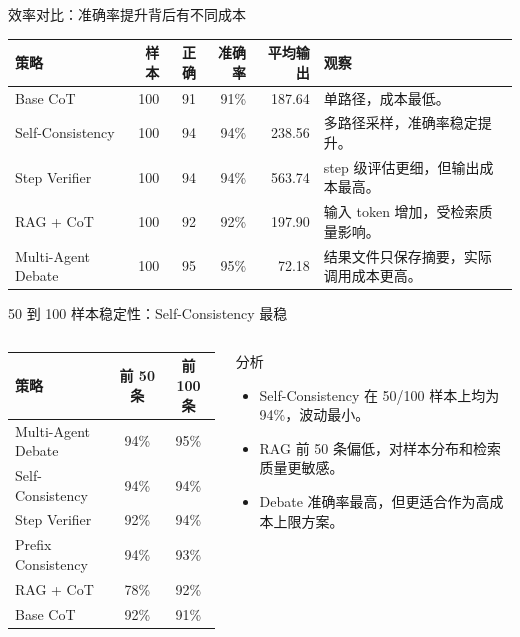 \documentclass[10pt,aspectratio=169]{beamer}
\newcommand{\tightitems}{\setlength{\itemsep}{0.24em}}
\newcommand{\smallnote}[1]{\vspace{0.25em}{\scriptsize\textcolor{Muted}{#1}}}
\begin{document}
\begin{frame}{效率对比：准确率提升背后有不同成本}
  \small
  \begin{tabularx}{\linewidth}{lrrrrY}
    \toprule
    策略 & 样本 & 正确 & 准确率 & 平均输出 & 观察 \\
    \midrule
    Base CoT & 100 & 91 & 91\% & 187.64 & 单路径，成本最低。 \\
    Self-Consistency & 100 & 94 & 94\% & 238.56 & 多路径采样，准确率稳定提升。 \\
    Step Verifier & 100 & 94 & 94\% & 563.74 & step 级评估更细，但输出成本最高。 \\
    RAG + CoT & 100 & 92 & 92\% & 197.90 & 输入 token 增加，受检索质量影响。 \\
    Multi-Agent Debate & 100 & 95 & 95\% & 72.18 & 结果文件只保存摘要，实际调用成本更高。 \\
    \bottomrule
  \end{tabularx}
  \smallnote{单位为实验 JSON 记录的平均 output tokens；Debate 的记录低估了真实中间讨论成本。}
\end{frame}

\begin{frame}{50 到 100 样本稳定性：Self-Consistency 最稳}
  \begin{columns}[T,onlytextwidth]
    \begin{column}{0.52\textwidth}
      \small
      \begin{tabular}{lcc}
        \toprule
        策略 & 前 50 条 & 前 100 条 \\
        \midrule
        Multi-Agent Debate & 94\% & 95\% \\
        Self-Consistency & 94\% & 94\% \\
        Step Verifier & 92\% & 94\% \\
        Prefix Consistency & 94\% & 93\% \\
        RAG + CoT & 78\% & 92\% \\
        Base CoT & 92\% & 91\% \\
        \bottomrule
      \end{tabular}
    \end{column}
    \begin{column}{0.44\textwidth}
      \begin{block}{分析}
        \scriptsize
        \begin{itemize}
          \tightitems
          \item Self-Consistency 在 50/100 样本上均为 94\%，波动最小。
          \item RAG 前 50 条偏低，对样本分布和检索质量更敏感。
          \item Debate 准确率最高，但更适合作为高成本上限方案。
        \end{itemize}
      \end{block}
    \end{column}
  \end{columns}
\end{frame}
\end{document}
